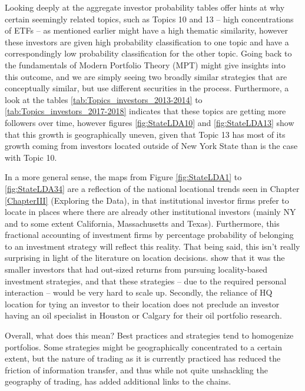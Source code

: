 Looking deeply at the aggregate investor probability tables offer hints at why  certain seemingly related topics, such as Topics 10 and 13 -- high concentrations of ETFs -- as mentioned earlier might have a high thematic similarity, however these investors are given high probability classification to one topic and have a correspondingly low probability classification for the other topic.  Going back to the fundamentals of Modern Portfolio Theory (MPT) might give insights into this outcome, and we are simply seeing two broadly similar strategies that are conceptually similar, but use different securities in the process.  Furthermore, a look at the tables \ref{tab:Topics_investors_2013-2014} to \ref{tab:Topics_investors_2017-2018} indicates that these topics are getting more followers over time, however figures \ref{fig:StateLDA10} and \ref{fig:StateLDA13} show that this growth is geographically uneven, given that Topic 13 has most of its growth coming from investors located outside of New York State than is the case with Topic 10. 

In a more general sense, the maps from Figure \ref{fig:StateLDA1} to \ref{fig:StateLDA34} are a reflection of the national locational trends seen in Chapter \ref{ChapterIII} (Exploring the Data), in that institutional investor firms prefer to locate in places where there are already other institutional investors (mainly NY and to some extent California, Massachusetts and Texas).  Furthermore, this fractional accounting of investment firms by percentage probability of belonging to an investment strategy will reflect this reality.  That being said, this isn't really surprising in light of the literature on location decisions.  \cite{covalthe2001} show that it was the smaller investors that had out-sized returns from pursuing locality-based investment strategies, and that these strategies -- due to the required personal interaction -- would be very hard to scale up.  Secondly, the reliance of HQ location for tying an investor to their location does not preclude an investor having an oil specialist in Houston or Calgary for their oil portfolio research. 

Overall, what does this mean?  Best practices and strategies tend to homogenize portfolios.  Some strategies might be geographically concentrated to a certain extent, but the nature of trading as it is currently practiced has reduced the friction of information transfer, and thus while not quite unshackling the geography of trading, has added additional links to the chains. 

